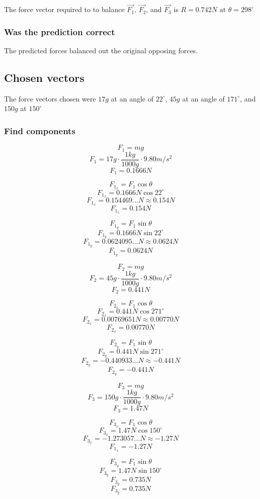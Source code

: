 \documentclass[11pt, letterpaper, includehead]{article}
\begin{document}
The force vector required to to balance $\vec{F_1}$, $\vec{F_2}$, and $\vec{F_3}$ is
$R = 0.742N \text{ at } \theta = 298^{\circ}$

\subsubsection{Was the prediction correct} %
The predicted forces balanced out the original opposing forces. 

\subsection{Chosen vectors} %
The force vectors chosen were $17g$ at an angle of $22^{\circ}$, $45g$ at an angle of $171^{\circ}$, and $150g$ at $150^{\circ}$

\subsubsection{Find components} %
\begin{multicols}{3}
  $$F_1 = mg$$
  $$F_1 = 17g \cdot \frac{1kg}{1000g} \cdot 9.80m/s^2$$
  $$F_1 = 0.1666N$$

  $$F_{1_x} = F_1\cos\theta$$
  $$F_{1_x} = 0.1666N\cos22^{\circ}$$
  $$F_{1_x} = 0.154469...N \approx 0.154N$$
  $$\boxed{F_{1_x} = 0.154N}$$

  $$F_{1_y} = F_1\sin\theta$$
  $$F_{1_y} = 0.1666N\sin22^{\circ}$$
  $$F_{1_y} = 0.0624095...N \approx 0.0624N$$
  $$\boxed{F_{1_y} = 0.0624N}$$

  \columnbreak
  $$F_2 = mg$$
  $$F_2 = 45g \cdot \frac{1kg}{1000g} \cdot 9.80m/s^2$$
  $$F_2 = 0.441N$$

  $$F_{2_x} = F_1\cos\theta$$
  $$F_{2_x} = 0.441N\cos271^{\circ}$$
  $$F_{2_x} = 0.00769651N \approx 0.00770N$$
  $$\boxed{F_{2_x} = 0.00770N}$$

  $$F_{2_y} = F_1\sin\theta$$
  $$F_{2_y} = 0.441N\sin271^{\circ}$$
  $$F_{2_y} = -0.440933...N \approx -0.441N$$
  $$\boxed{F_{2_y} = -0.441N}$$

  \columnbreak
  $$F_3 = mg$$
  $$F_3 = 150g \cdot \frac{1kg}{1000g} \cdot 9.80m/s^2$$
  $$F_3 = 1.47N$$

  $$F_{3_x} = F_1\cos\theta$$
  $$F_{3_x} = 1.47N\cos150^{\circ}$$
  $$F_{3_x} = -1.273057...N \approx -1.27N$$
  $$\boxed{F_{1_x} = -1.27N}$$

  $$F_{3_y} = F_1\sin\theta$$
  $$F_{3_y} = 1.47N\sin150^{\circ}$$
  $$F_{3_y} = 0.735N$$
  $$\boxed{F_{3_y} = 0.735N}$$
 
\end{multicols}
\end{document}
